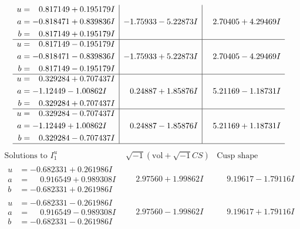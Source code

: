 \documentclass[1p]{elsarticle_modified}
\theoremstyle{definition}
\newcommand{\I}{\sqrt{-1}}
\begin{document}
$$\begin{array}{c|c|c}
\begin{aligned}
u &= \phantom{-}0.817149 + 0.195179 I \\
a &= -0.818471 + 0.839836 I \\
b &= \phantom{-}0.817149 + 0.195179 I\end{aligned}
 & -1.75933 - 5.22873 I & \phantom{-}2.70405 + 4.29469 I \\ \hline\begin{aligned}
u &= \phantom{-}0.817149 - 0.195179 I \\
a &= -0.818471 - 0.839836 I \\
b &= \phantom{-}0.817149 - 0.195179 I\end{aligned}
 & -1.75933 + 5.22873 I & \phantom{-}2.70405 - 4.29469 I \\ \hline\begin{aligned}
u &= \phantom{-}0.329284 + 0.707437 I \\
a &= -1.12449 - 1.00862 I \\
b &= \phantom{-}0.329284 + 0.707437 I\end{aligned}
 & \phantom{-}0.24887 + 1.85876 I & \phantom{-}5.21169 - 1.18731 I \\ \hline\begin{aligned}
u &= \phantom{-}0.329284 - 0.707437 I \\
a &= -1.12449 + 1.00862 I \\
b &= \phantom{-}0.329284 - 0.707437 I\end{aligned}
 & \phantom{-}0.24887 - 1.85876 I & \phantom{-}5.21169 + 1.18731 I\\
 \hline 
 \end{array}$$\newpage$$\begin{array}{c|c|c}  
\text{Solutions to }I^u_{1}& \I (\text{vol} + \sqrt{-1}CS) & \text{Cusp shape}\\
 \hline 
\begin{aligned}
u &= -0.682331 + 0.261986 I \\
a &= \phantom{-}0.916549 + 0.989308 I \\
b &= -0.682331 + 0.261986 I\end{aligned}
 & \phantom{-}2.97560 + 1.99862 I & \phantom{-}9.19617 - 1.79116 I \\ \hline\begin{aligned}
u &= -0.682331 - 0.261986 I \\
a &= \phantom{-}0.916549 - 0.989308 I \\
b &= -0.682331 - 0.261986 I\end{aligned}
 & \phantom{-}2.97560 - 1.99862 I & \phantom{-}9.19617 + 1.79116 I \\ \hline\begin{aligned}

\end{aligned}
\end{array}$$
\end{document}
